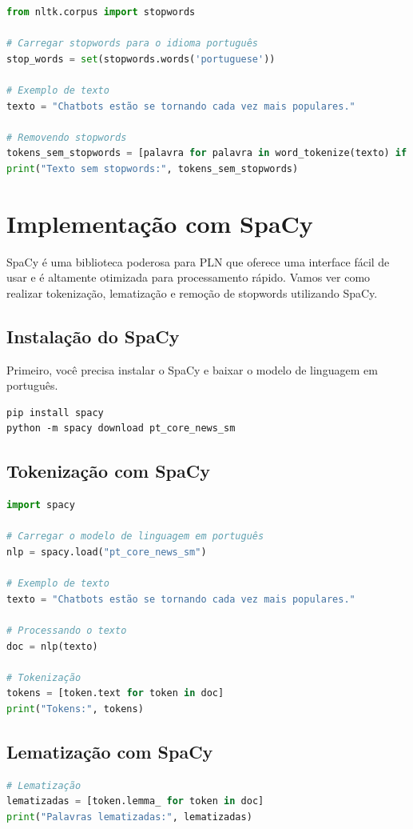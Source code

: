 \documentclass[14pt,a4paper,oneside]{book}
\begin{document}
\begin{lstlisting}[language=Python]
from nltk.corpus import stopwords

# Carregar stopwords para o idioma português
stop_words = set(stopwords.words('portuguese'))

# Exemplo de texto
texto = "Chatbots estão se tornando cada vez mais populares."

# Removendo stopwords
tokens_sem_stopwords = [palavra for palavra in word_tokenize(texto) if palavra.lower() not in stop_words]
print("Texto sem stopwords:", tokens_sem_stopwords)
\end{lstlisting}

\section{Implementação com SpaCy}

SpaCy é uma biblioteca poderosa para PLN que oferece uma interface fácil de usar e é altamente otimizada para processamento rápido. Vamos ver como realizar tokenização, lematização e remoção de stopwords utilizando SpaCy.

\subsection{Instalação do SpaCy}
Primeiro, você precisa instalar o SpaCy e baixar o modelo de linguagem em português.

\begin{verbatim}
pip install spacy
python -m spacy download pt_core_news_sm
\end{verbatim}

\subsection{Tokenização com SpaCy}
\begin{lstlisting}[language=Python]
import spacy

# Carregar o modelo de linguagem em português
nlp = spacy.load("pt_core_news_sm")

# Exemplo de texto
texto = "Chatbots estão se tornando cada vez mais populares."

# Processando o texto
doc = nlp(texto)

# Tokenização
tokens = [token.text for token in doc]
print("Tokens:", tokens)
\end{lstlisting}

\subsection{Lematização com SpaCy}
\begin{lstlisting}[language=Python]
# Lematização
lematizadas = [token.lemma_ for token in doc]
print("Palavras lematizadas:", lematizadas)
\end{lstlisting}
\end{document}
